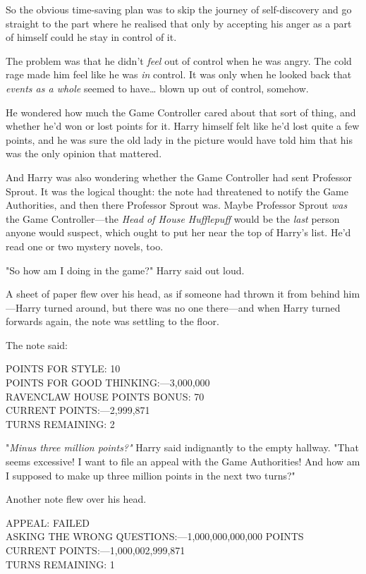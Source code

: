 So the obvious time-saving plan was to skip the journey of self-discovery and 
go straight to the part where he realised that only by accepting his anger as a 
part of himself could he stay in control of it.

The problem was that he didn't \emph{feel} out of control when he was angry. 
The cold rage made him feel like he was \emph{in} control. It was only when he 
looked back that \emph{events as a whole} seemed to have{\ldots} blown up out 
of control, somehow.

He wondered how much the Game Controller cared about that sort of thing, and 
whether he'd won or lost points for it. Harry himself felt like he'd lost quite 
a few points, and he was sure the old lady in the picture would have told him 
that his was the only opinion that mattered.

And Harry was also wondering whether the Game Controller had sent Professor 
Sprout. It was the logical thought: the note had threatened to notify the Game 
Authorities, and then there Professor Sprout was. Maybe Professor Sprout 
\emph{was} the Game Controller---the\emph{ Head of House Hufflepuff} would be 
the \emph{last} person anyone would suspect, which ought to put her near the 
top of Harry's list. He'd read one or two mystery novels, too.

"So how am I doing in the game?" Harry said out loud.

A sheet of paper flew over his head, as if someone had thrown it from behind 
him---Harry turned around, but there was no one there---and when Harry turned 
forwards again, the note was settling to the floor.

The note said:

POINTS FOR STYLE: 10\\
POINTS FOR GOOD THINKING:---3,000,000\\
RAVENCLAW HOUSE POINTS BONUS: 70\\
CURRENT POINTS:---2,999,871\\
TURNS REMAINING: 2

"\emph{Minus three million points?"} Harry said indignantly to the empty 
hallway. "That seems excessive! I want to file an appeal with the Game 
Authorities! And how am I supposed to make up three million points in the next 
two turns?"

Another note flew over his head.

APPEAL: FAILED\\
ASKING THE WRONG QUESTIONS:---1,000,000,000,000 POINTS\\
CURRENT POINTS:---1,000,002,999,871\\
TURNS REMAINING: 1

